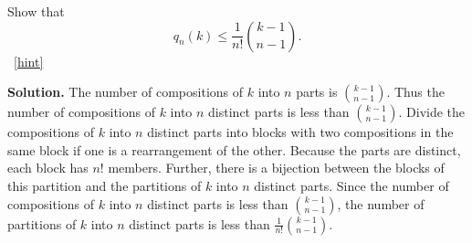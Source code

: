 \documentclass{book}
\begin{document}
\setcounter{project}{310}
\addtocounter{project}{-1}
\begin{activity}[]\label{activity-303}
\hypertarget{p-1591}{}%
Show that%
\begin{equation*}
q_n(k) \le \frac{1}{n!}\binom{k-1}{n-1}.
\end{equation*}
%
~\hfill{\tiny\hyperlink{a-310}{[hint]}\hypertarget{q-310}{}}\par\smallskip%
\noindent\textbf{Solution.}\hypertarget{solution-229}{}\quad%
\hypertarget{p-1593}{}%
The number of compositions of \(k\) into \(n\) parts is \(\binom{k-1}{n-1}\). Thus the number of compositions of \(k\) into \(n\) distinct parts is less than \(\binom{k-1}{n-1}\). Divide the compositions of \(k\) into \(n\) distinct parts into blocks with two compositions in the same block if one is a rearrangement of the other. Because the parts are distinct, each block has \(n!\) members. Further, there is a bijection between the blocks of this partition and the partitions of \(k\) into \(n\) distinct parts. Since the number of compositions of \(k\) into \(n\) distinct parts is less than \(\binom{k-1}{n-1}\), the number of partitions of \(k\) into \(n\) distinct parts is less than \(\frac{1}{n!}  \binom{k-1}{n-1}\).%
\end{activity}
\end{document}
